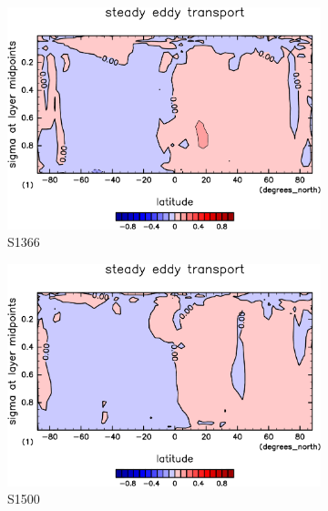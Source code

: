 \documentclass[body]{subfiles}
\begin{document}
\begin{figure}[t]
	\centering
	\begin{subfigure}{.4\textwidth}
		\centering
		\includegraphics[width=\textwidth]{S1366/MeriHeatTransTest@latentEn_SE,time=14600:14965-crop-rotate.pdf}
		\caption{S1366}\label{潜熱停滞性擾乱S1366}
	\end{subfigure}
	\begin{subfigure}{.4\textwidth}
		\centering
		\includegraphics[width=\textwidth]{S1500/MeriHeatTransTest@latentEn_SE,time=3650:4015-crop-rotate.pdf}
		\caption{S1500}\label{潜熱停滞性擾乱S1500}
	\end{subfigure}
	\begin{subfigure}{.4\textwidth}
		\centering

\end{subfigure}
\end{figure}
\end{document}
